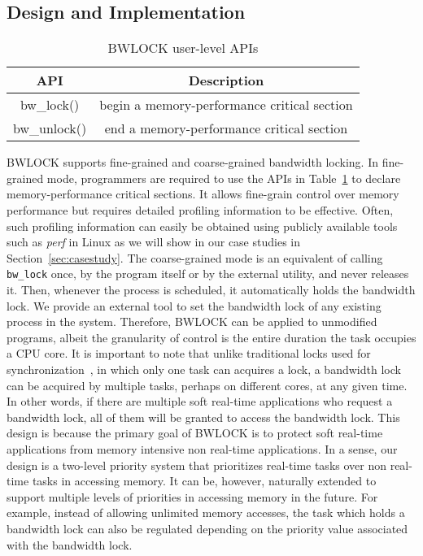 \documentclass[times, 10pt,onecolumn]{article}
\newcommand{\bottomrule}{\hline}
\newcommand{\toprule}{\hline}
\newcommand{\midrule}{\hline}
\begin{document}
\subsection{Design and Implementation}

\begin{table}
\centering
\begin{tabular}{c|c}
\toprule
API & Description \\
\midrule
bw\_lock() & begin a memory-performance critical section \\
bw\_unlock() & end a memory-performance critical section \\
\bottomrule
\end{tabular}\caption{BWLOCK user-level APIs}
\label{tbl:bwlock-user}
\end{table}


BWLOCK supports fine-grained and coarse-grained bandwidth
locking. In fine-grained mode, programmers are required to use the
APIs in Table~\ref{tbl:bwlock-user} to declare memory-performance
critical sections. It allows fine-grain control over memory
performance but requires detailed profiling information to be
effective. Often, such profiling information can easily be obtained
using publicly available tools such as \emph{perf} in Linux as we will
show in our case studies in Section~\ref{sec:casestudy}. The
coarse-grained mode is an equivalent of calling \texttt{bw\_lock}
once, by the program itself or by the external utility, and never
releases it. Then, whenever the process is scheduled, it automatically
holds the bandwidth lock. We provide an external tool to set the
bandwidth lock of any existing process in the system. Therefore,
BWLOCK can be applied to unmodified programs, albeit the
granularity of control is the entire duration the task occupies a CPU
core. It is important to note that unlike traditional locks used
for synchronization~\cite{block2007flexible}, in which only one task can acquires a lock, a
bandwidth lock can be acquired by multiple tasks, perhaps on different
cores, at any given time. In other words, if there are multiple soft
real-time applications who request a bandwidth lock, all of them will
be granted to access the bandwidth lock. This design is because the
primary goal of BWLOCK is to protect soft real-time applications from
memory intensive non real-time applications. In a sense, our design is
a two-level priority system that prioritizes real-time tasks over non
real-time tasks in accessing memory. It can be, however, naturally
extended to support multiple levels of priorities in accessing memory
in the future. For example, instead of allowing unlimited memory
accesses, the task which holds a bandwidth lock can also be regulated
depending on the priority value associated with the bandwidth lock.
\end{document}
